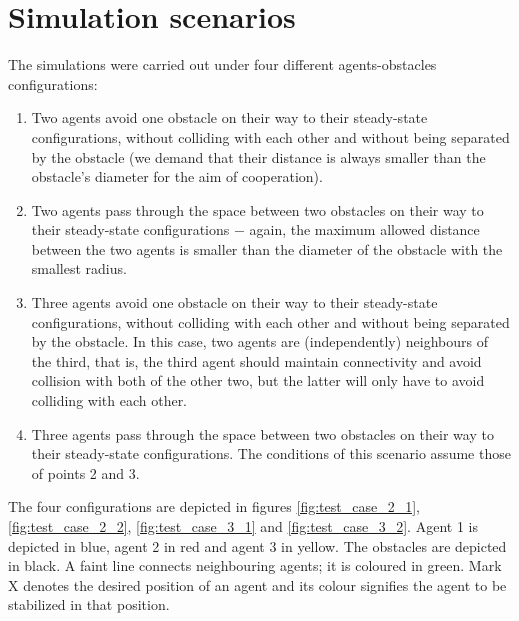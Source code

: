 \section{Simulation scenarios}

The simulations were carried out under four different agents-obstacles
configurations:

\begin{enumerate}
  \item Two agents avoid one obstacle on their way to their
    steady-state configurations, without colliding with each other and without
    being separated by the obstacle (we demand that their distance is always
    smaller than the obstacle's diameter for the aim of cooperation).
  \item Two agents pass through the space between two obstacles
    on their way to their steady-state configurations $-$ again, the maximum
    allowed distance between the two agents is smaller than the diameter
    of the obstacle with the smallest radius.
  \item Three agents avoid one obstacle on their way to their
    steady-state configurations, without colliding with each other and without
    being separated by the obstacle. In this case, two agents are
    (independently) neighbours of the third, that is, the third agent should
    maintain connectivity and avoid collision with both of the other two,
    but the latter will only have to avoid colliding with each other.
  \item Three agents pass through the space between two obstacles
    on their way to their steady-state configurations. The conditions of this
    scenario assume those of points 2 and 3.
\end{enumerate}

The four configurations are depicted in figures \eqref{fig:test_case_2_1},
\eqref{fig:test_case_2_2}, \eqref{fig:test_case_3_1} and
\eqref{fig:test_case_3_2}. Agent 1 is depicted in blue, agent 2 in
red and agent 3 in yellow. The obstacles are depicted in black. A faint line
connects neighbouring agents; it is coloured in green. Mark X
denotes the desired position of an agent and its colour signifies the agent
to be stabilized in that position.


\noindent{}

